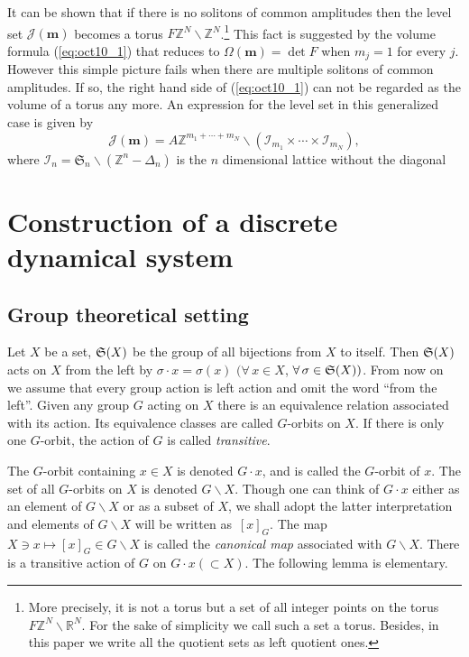 \documentclass[11pt]{article}
\newcommand{\Z}{{\mathbb Z}}
\newcommand{\R}{{\mathbb R}}
\newcommand{\J}{{\mathcal J}}
\newcommand{\m}{{\boldsymbol m}}
\begin{document}
{It can be shown that}
if there is no solitons of common amplitudes then
the level set $\J (\m)$ becomes a torus $F \Z^N \backslash \Z^N $.\footnote{More precisely, it is not a torus but a set of all integer points on the torus $F \Z^N \backslash \R^N $.
For the sake of simplicity we call such a set a torus.
Besides, in this paper we write all the quotient sets as left quotient ones.}
This fact is suggested by
the volume formula (\ref{eq:oct10_1}) that reduces to $\Omega(\m) =\det F$ when $m_j=1$ for every $j$.
However this simple picture fails when there are multiple solitons of common amplitudes.
{If so,} the right hand side of (\ref{eq:oct10_1}) can not be regarded as the volume of a torus any more.
{An expression for} the level set in this generalized case is given by
\begin{equation}\label{eq:jv}
\J (\m) =  A \Z^{m_1+\cdots + m_{N}} \backslash ({\mathcal I}_{m_1}\times
\cdots \times {\mathcal I}_{m_N}),
\end{equation}
where ${\mathcal I}_n = {\mathfrak S}_n \backslash (\Z^n-\Delta_n)$ is
the $n$ dimensional lattice without the diagonal
\setcounter{section}{1}
\setcounter{subsection}{0}
\setcounter{subsubsection}{0}
\setcounter{equation}{2}
\section{Construction of a discrete dynamical system}\label{sec:2}

\subsection{Group theoretical setting}\label{subsec:2_1}

Let $X$ be a set, ${\frak S}(X)$ be the group of all bijections from $X$ to itself.
Then ${\frak S}(X)$ acts on $X$ from the left by $\sigma \cdot x = \sigma (x)$
$(\forall \, x \in X$, $\forall \, \sigma \in {\frak S}(X))$.
{}From now on we assume that every group action is left action
and omit the word ``from the left''.
Given any group $G$ acting on $X$ there is an equivalence relation associated with its action.
Its equivalence classes are called $G$-orbits on $X$.
If there is only one $G$-orbit, the action of $G$ is called \textit{transitive}.

The $G$-orbit containing $x \in X$ is denoted $G \cdot x$, and is
called the $G$-orbit of $x$.
The set of all $G$-orbits on $X$ is denoted $G \backslash X$.
Though one can think of $G \cdot x$ either as an element of $G \backslash X$ or as a subset of $X$,
we shall adopt the latter interpretation and
elements of $G \backslash X$ will be written as~$[x]_G$.
The map $X \ni x \mapsto [x]_G \in G \backslash X$ is called the \textit{canonical map}
associated with $G \backslash X$.
There is a transitive action of
$G$ on $G \cdot x (\subset X)$.
The following lemma is elementary.
\end{document}
